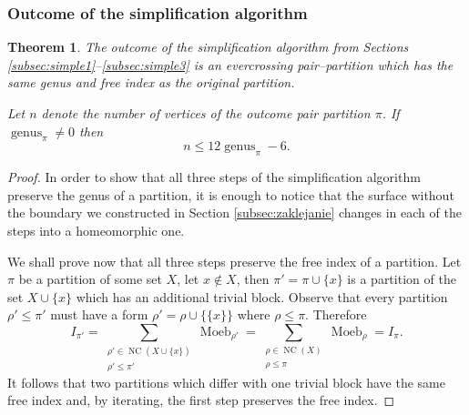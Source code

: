 \documentclass[12pt,dvips]{amsart}
\numberwithin{equation}{section} \numberwithin{figure}{section}
\theoremstyle{plain}
\newtheorem{theorem}[lemma]{Theorem}
\theoremstyle{definition}
\theoremstyle{remark}
\DeclareMathOperator{\NC}{NC}
\DeclareMathOperator{\Moeb}{Moeb}
\DeclareMathOperator{\genus}{genus}
\begin{document}
\subsubsection{Outcome of the simplification algorithm}
\begin{theorem}
\label{theo:gorneszacowanie} The outcome of the simplification
algorithm from Sections \ref{subsec:simple1}--\ref{subsec:simple3}
is an evercrossing pair--partition which has the same genus and free
index as the original partition.

Let $n$ denote the number of vertices of the outcome pair partition
$\pi$. If $\genus_\pi\neq 0$ then
\begin{equation}
n\leq 12 \genus_{\pi}-6. \label{eq:szacowanie}
\end{equation}
\end{theorem}
\begin{proof}
In order to show that all three steps of the simplification
algorithm preserve the genus of a partition, it is enough to notice
that the surface without the boundary we constructed in Section
\ref{subsec:zaklejanie} changes in each of the steps into a
homeomorphic one.

We shall prove now that all three steps preserve the free index of a
partition. Let $\pi$ be a partition of some set $X$, let $x\notin
X$, then $\pi'=\pi\cup \{ x \}$ is a partition of the set $X \cup
\{x\}$ which has an additional trivial block. Observe that every
partition $\rho'\leq \pi'$ must have a form $\rho'=\rho \cup \big\{
\{x\} \big\}$ where $\rho\leq\pi$. Therefore
$$I_{\pi'}=\sum_{\substack{ \rho'\in\NC(X \cup \{x\}) \\ \rho'\leq \pi'}} \Moeb_{\rho'} =
\sum_{\substack{ \rho\in\NC(X) \\ \rho\leq \pi}} \Moeb_{\rho} =
I_{\pi}.$$ It follows that two partitions which differ with one
trivial block have the same free index and, by iterating, the first
step preserves the free index.


\end{proof}
\end{document}
